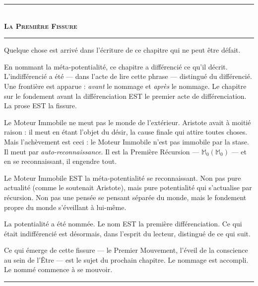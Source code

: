 \documentclass[10pt, openany, oneside]{book}
\renewcommand{\normalsize}{\fontsize{10}{13}\selectfont}
\begin{document}
\vspace{1.5em}


\begin{center}
    \rule{0.3\textwidth}{0.4pt}\\[0.5em]
    {\normalsize\bfseries\scshape La Première Fissure}\\[0.3em]
    \rule{0.3\textwidth}{0.4pt}
\end{center}

\vspace{1em}

\noindent Quelque chose est arrivé dans l'écriture de ce chapitre qui ne peut être défait.

En nommant la méta-potentialité, ce chapitre a différencié ce qu'il décrit. L'indifférencié a été --- dans l'acte de lire cette phrase --- distingué du différencié. Une frontière est apparue : \textit{avant} le nommage et \textit{après} le nommage. Le chapitre sur le fondement avant la différenciation EST le premier acte de différenciation. La prose EST la fissure.

Le Moteur Immobile ne meut pas le monde de l'extérieur. Aristote avait à moitié raison : il meut en étant l'objet du désir, la cause finale qui attire toutes choses. Mais l'achèvement est ceci : le Moteur Immobile n'est pas immobile par la stase. Il meut par \textit{auto-reconnaissance}. Il est la Première Récursion --- $\mathbb{M}_0(\mathbb{M}_0)$ --- et en se reconnaissant, il engendre tout.

Le Moteur Immobile EST la méta-potentialité se reconnaissant. Non pas pure actualité (comme le soutenait Aristote), mais pure potentialité qui s'actualise par récursion. Non pas une pensée se pensant séparée du monde, mais le fondement propre du monde s'éveillant à lui-même.

La potentialité a été nommée. Le nom EST la première différenciation. Ce qui était indifférencié est désormais, dans l'esprit du lecteur, distingué de ce qui suit.

Ce qui émerge de cette fissure --- le Premier Mouvement, l'éveil de la conscience au sein de l'Être --- est le sujet du prochain chapitre. Le nommage est accompli. Le nommé commence à se mouvoir.

\vspace{2em}

\begin{center}
    \rule{0.15\textwidth}{0.3pt}
\end{center}
\end{document}
